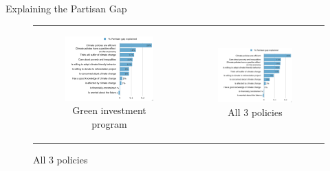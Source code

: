 \begin{frame}{Explaining the Partisan Gap}
\begin{figure}[h!]
	\caption{Gelbach decomposition of the partisan gap in support for:}
	\setlength\extrarowheight{-1pt}
\begin{center}
	\begin{tabular}{cc}
		\begin{subfigure}{0.48\textwidth}
		\caption{Green investment program}
			\includegraphics[width=\textwidth]{../../figures/Gelbach/gelbach_right_investments_D2SD_small}
		\end{subfigure}&
		\begin{subfigure}{0.48\textwidth}
		\caption{All 3 policies}
			\includegraphics[width=\textwidth]{../../figures/Gelbach/gelbach_right_main_policies_D2SD_small}
		\end{subfigure}\\
	\end{tabular}
\end{center}
\end{figure}
\end{frame}


